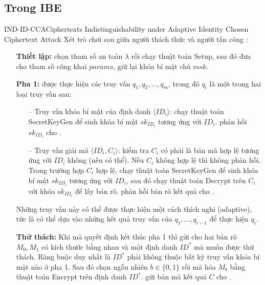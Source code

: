 \documentclass[class=report, crop=false]{standalone}
\begin{document}
		\subsection{Trong IBE}
			\begin{game}{IND-ID-CCA}{Ciphertexts Indistinguishability under Adaptive Identity Chosen Ciphertext Attack}
				Xét trò chơi sau giữa người thách thức \challenger và người tấn công \adversary:
				\vspace{-1.8\baselineskip}
				\begin{itemize}[leftmargin=1.5cm, itemindent=-0.5cm]
					\item[] \textbf{Thiết lập:} \challenger chọn tham số an toàn $\lambda$ rồi chạy thuật toán \textsf{Setup}, sau đó đưa cho \adversary tham số công khai $params$, giữ lại khóa bí mật chủ $msk$.
					\item[] \textbf{Pha 1:} \adversary được thực hiện các truy vấn $q_1, q_2, ..., q_m$, trong đó $q_i$ là một trong hai loại truy vấn sau:
					\begin{itemize}
						\item[--] Truy vấn khóa bí mật của định danh $\langle ID_i \rangle$: \challenger chạy thuật toán \textsf{SecretKeyGen} để sinh khóa bí mật $sk_{ID_i}$ tương ứng với $ID_i$. \challenger phản hồi $sk_{ID_i}$ cho \adversary .
						\item[--] Truy vấn giải mã $\langle ID_i, C_i \rangle$: \challenger kiểm tra $C_i$ có phải là bản mã hợp lệ tương ứng với $ID_i$ không (nếu có thể). Nếu $C_i$ không hợp lệ thì \challenger không phản hồi. Trong trường hợp $C_i$ hợp lệ, \challenger chạy thuật toán \textsf{SecretKeyGen} để sinh khóa bí mật $sk_{ID_i}$ tương ứng với $ID_i$, sau đó chạy thuật toán \textsf{Decrypt} trên $C_i$ với khóa $sk_{ID_i}$ để lấy bản rõ. \challenger phản hồi bản rõ kết quả cho \adversary .
					\end{itemize}
					Những truy vấn này có thể được thực hiện một cách thích nghi (adaptive), tức là \adversary có thể dựa vào những kết quả truy vấn của $q_1, ..., q_{i - 1}$ để thực hiện $q_i$.
					\item[] \textbf{Thử thách:} Khi mà \adversary quyết định kết thúc pha 1 thì \adversary gửi cho \challenger hai bản rõ $M_0, M_1$ có kích thước bằng nhau và một định danh $ID^*$ mà \adversary muốn được thử thách. Ràng buộc duy nhất là $ID^*$ phải không thuộc bất kỳ truy vấn khóa bí mật nào ở pha 1. Sau đó \challenger chọn ngẫu nhiên $b \in \{0, 1\}$ rồi mã hóa $M_b$ bằng thuật toán \textsf{Encrypt} trên định danh $ID^*$. \challenger gửi bản mã kết quả $C$ cho \adversary.

\end{itemize}
\end{game}
\end{document}

